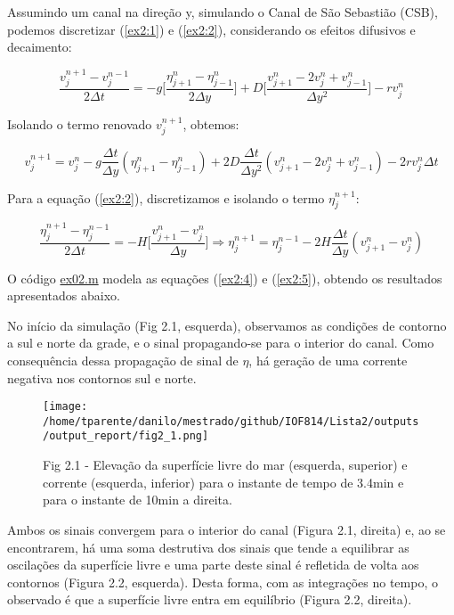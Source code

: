 \documentclass[11pt]{article}
\makeatletter
\def\maxwidth{\ifdim\Gin@nat@width>\linewidth\linewidth
    \else\Gin@nat@width\fi}
\let\Oldincludegraphics\includegraphics
\renewcommand{\includegraphics}[1]{\Oldincludegraphics[width=.8\maxwidth]{#1}}
\makeatother
\begin{document}
Assumindo um canal na direção y, simulando o Canal de São Sebastião
(CSB), podemos discretizar (\ref{ex2:1}) e (\ref{ex2:2}), considerando
os efeitos difusivos e decaimento:

\begin{equation}
    \frac{v^{n+1}_{j} - v^{n-1}_{j}}{2\Delta{t}} = -g\bigg[ \frac{\eta^{n}_{j+1}  - \eta^{n}_{j-1}}{2\Delta{y}} \bigg] + D\bigg[ \frac{v^{n}_{j+1} - 2v^{n}_{j} + v^{n}_{j-1}}{\Delta{y^2}} \bigg] - rv^{n}_{j}
    \label{ex2:3}
\end{equation}
\bigskip

Isolando o termo renovado \(v^{n+1}_{j}\), obtemos:

\begin{equation}
    v^{n+1}_{j} = v^{n}_{j} - g\frac{\Delta{t}}{\Delta{y}}(\eta^{n}_{j+1} - \eta^{n}_{j-1}) + 2D\frac{\Delta{t}}{\Delta{y^2}}(v^{n}_{j+1} - 2v^{n}_{j} + v^{n}_{j-1}) - 2rv^{n}_{j}\Delta{t}
    \label{ex2:4}
\end{equation}

\bigskip
Para a equação (\ref{ex2:2}), discretizamos e isolando o termo
\(\eta^{n+1}_{j}\):

\begin{equation}
    \frac{\eta^{n+1}_{j} - \eta^{n-1}_{j}}{2\Delta{t}} = -H\bigg[ \frac{v^{n}_{j+1} - v^{n}_{j}}{\Delta{y}} \bigg] \Rightarrow \eta^{n+1}_{j} = \eta^{n-1}_{j} - 2H\frac{\Delta{t}}{\Delta{y}}(v^{n}_{j+1} - v^{n}_{j})
    \label{ex2:5}
\end{equation}

O código \href{../codes/ex02.m}{ex02.m} modela as equações (\ref{ex2:4})
e (\ref{ex2:5}), obtendo os resultados apresentados abaixo.
\bigskip

No início da simulação (Fig 2.1, esquerda), observamos as condições
de contorno a sul e norte da grade, e o sinal propagando-se para o
interior do canal. Como consequência dessa propagação de sinal de
\(\eta\), há geração de uma corrente negativa nos contornos sul e norte.


\begin{figure}
\centering
\centerline{\hbox{\texttt{[image: /home/tparente/danilo/mestrado/github/IOF814/Lista2/outputs/output\_report/fig2\_1.png]}}}
\caption{Fig 2.1 - Elevação da superfície livre do mar (esquerda, superior) e corrente (esquerda, inferior) para o instante
de tempo de 3.4min e para o instante de 10min a direita.}
\label{fig2:1}
\end{figure}

Ambos os sinais convergem para o interior do canal (Figura 2.1, direita)
e, ao se encontrarem, há uma soma destrutiva dos sinais que tende a
equilibrar as oscilações da superfície livre e uma parte deste sinal é
refletida de volta aos contornos (Figura 2.2, esquerda). Desta forma,
com as integrações no tempo, o observado é que a superfície livre entra
em equilíbrio (Figura 2.2, direita).
\end{document}
